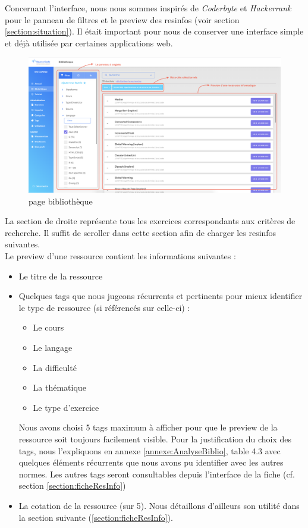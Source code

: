 Concernant l'interface, nous nous sommes inspirés de \textit{Coderbyte} et \textit{Hackerrank} pour le panneau de filtres et le preview des \glspl{resinfo} (voir section \ref{section:situation}). Il était important pour nous de conserver une interface simple et déjà utilisée par certaines applications web.

\begin{figure}[H]
    \includegraphics[width=\textwidth,height=\textheight,keepaspectratio]{images/client/search-library.png}
    \centering
    \caption[SourceCode : page bibliothèque]{page bibliothèque}
\end{figure}


La section de droite représente tous les exercices correspondants aux critères de recherche. Il suffit de scroller dans cette section afin de charger les \glspl{resinfo} suivantes.\\

Le preview d'une ressource contient les informations suivantes :

\begin{itemize}
    \item Le titre de la ressource
    \item Quelques \glspl{tag} que nous jugeons récurrents et pertinents pour mieux identifier le type de ressource (si référencés sur celle-ci) : 
    \begin{itemize}
        \item Le cours
        \item Le langage
        \item La difficulté
        \item La thématique
        \item Le type d'exercice
    \end{itemize}
    Nous avons choisi 5 \glspl{tag} maximum à afficher pour que le preview de la ressource soit toujours facilement visible. Pour la justification du choix des \glspl{tag}, nous l'expliquons en annexe \ref{annexe:AnalyseBiblio}, table 4.3 avec quelques éléments récurrents que nous avons pu identifier avec les autres normes.
    Les autres \glspl{tag} seront consultables depuis l'interface de la \gls{fiche} (cf. section \ref{section:ficheResInfo})
    \item La cotation de la ressource (sur 5). Nous détaillons d'ailleurs son utilité dans la section suivante (\ref{section:ficheResInfo}).
\end{itemize}

